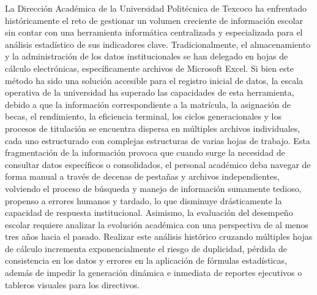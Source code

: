 La Dirección Académica de la Universidad Politécnica de Texcoco ha enfrentado históricamente el reto de gestionar un volumen creciente de información escolar sin contar con una herramienta informática centralizada y especializada para el análisis estadístico de sus indicadores clave. 
Tradicionalmente, el almacenamiento y la administración de los datos institucionales se han delegado en hojas de cálculo electrónicas, específicamente archivos de Microsoft Excel. Si bien este método ha sido una solución accesible para el registro inicial de datos, 
la escala operativa de la universidad ha superado las capacidades de esta herramienta, debido a que la información correspondiente a la matrícula, la asignación de becas, el rendimiento, la eficiencia terminal, los ciclos generacionales y los procesos de titulación se encuentra dispersa en múltiples archivos individuales, cada uno estructurado con complejas estructuras de varias hojas de trabajo. 
Esta fragmentación de la información provoca que cuando surge la necesidad de consultar datos específicos o consolidados, el personal académico deba navegar de forma manual a través de decenas de pestañas y archivos independientes, volviendo el proceso de búsqueda y manejo de información sumamente tedioso, propenso a errores humanos y tardado, lo que disminuye drásticamente la capacidad de respuesta institucional. Asimismo, la evaluación del desempeño escolar requiere analizar la evolución académica con una perspectiva de al menos tres años hacia el pasado. 
Realizar este análisis histórico cruzando múltiples hojas de cálculo incrementa exponencialmente el riesgo de duplicidad, pérdida de consistencia en los datos y errores en la aplicación de fórmulas estadísticas, además de impedir la generación dinámica e inmediata de reportes ejecutivos o tableros visuales para los directivos.


